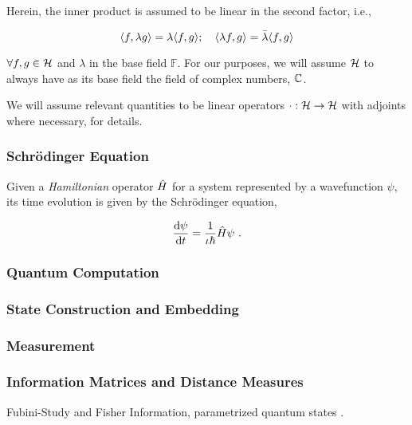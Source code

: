 Herein, the inner product is assumed to be linear in the second factor, i.e.,

\begin{equation*}
    \langle f, \lambda g\rangle = \lambda \langle f, g\rangle; \quad \langle \lambda f, g\rangle = \bar{\lambda} \langle f, g\rangle
\end{equation*}

\(\forall f, g \in \mathcal{H}\) and \(\lambda\) in the base field
\(\mathbb{F}\). For our purposes, we will assume \(\mathcal{H}\) to always
have as its base field the field of complex numbers, \(\mathbb{C}\).

We will assume relevant quantities to be linear operators \(\cdot :
\mathcal{H} \to \mathcal{H}\) with adjoints where necessary,
\cite[see][Appendix A]{hall2013quantum} for details.

\subsubsection{Schr\"odinger Equation}
Given a \emph{Hamiltonian} operator \(\hat{H}\) for a system represented by
a wavefunction \(\psi\), its time evolution is given by the Schr\"odinger
equation,

\begin{equation}
    \frac{\dd{\psi}}{\dd{t}} = \frac{1}{\iota\hbar} \hat{H} \psi~.
    \label{eq:schrodinger}
\end{equation}

\subsubsection{Quantum Computation}

\subsubsection{State Construction and Embedding}

\subsubsection{Measurement}

\subsubsection{Information Matrices and Distance Measures}
\label{subsubsec:distanceinfo}

Fubini-Study and Fisher Information, parametrized quantum states
\cite{meyer2021fisher}.
